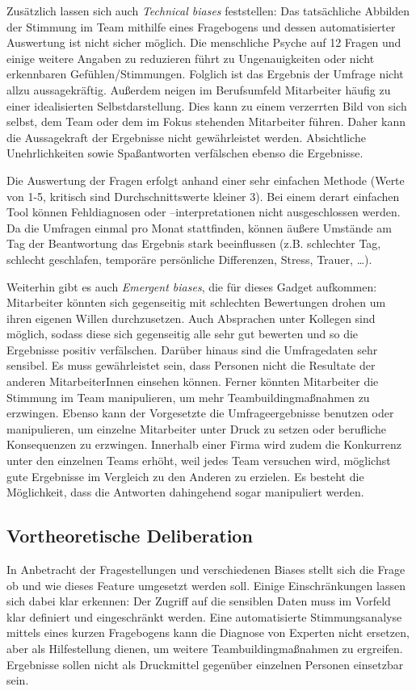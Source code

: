 \documentclass[a4paper,12pt,]{article}
\begin{document}
Zusätzlich lassen sich auch \emph{Technical biases} feststellen:  
Das tatsächliche Abbilden der Stimmung im Team mithilfe eines Fragebogens und dessen automatisierter Auswertung ist nicht sicher möglich. Die menschliche Psyche auf 12 Fragen und einige weitere Angaben zu reduzieren führt zu Ungenauigkeiten oder nicht erkennbaren Gefühlen/Stimmungen. Folglich ist das Ergebnis der Umfrage nicht allzu aussagekräftig.
Außerdem neigen im Berufsumfeld Mitarbeiter häufig zu einer idealisierten Selbstdarstellung. Dies kann zu einem verzerrten Bild von sich selbst, dem Team oder dem im Fokus stehenden Mitarbeiter führen. Daher kann die Aussagekraft der Ergebnisse nicht gewährleistet werden. Absichtliche Unehrlichkeiten sowie Spaßantworten verfälschen ebenso die Ergebnisse.

Die Auswertung der Fragen erfolgt anhand einer sehr einfachen Methode (Werte von 1-5, kritisch sind Durchschnittswerte kleiner 3). Bei einem derart einfachen Tool können Fehldiagnosen oder –interpretationen nicht ausgeschlossen werden. 
Da die Umfragen einmal pro Monat stattfinden, können äußere Umstände am Tag der Beantwortung das Ergebnis stark beeinflussen (z.B. schlechter Tag, schlecht geschlafen, temporäre persönliche Differenzen, Stress, Trauer, …).

Weiterhin gibt es auch \emph{Emergent biases}, die für dieses Gadget aufkommen: Mitarbeiter könnten sich gegenseitig mit schlechten Bewertungen drohen um ihren eigenen Willen durchzusetzen. Auch Absprachen unter Kollegen sind möglich, sodass diese sich gegenseitig alle sehr gut bewerten und so die Ergebnisse positiv verfälschen. Darüber hinaus sind die Umfragedaten sehr sensibel. Es muss gewährleistet sein, dass Personen nicht die Resultate der anderen MitarbeiterInnen einsehen können.
Ferner könnten Mitarbeiter die Stimmung im Team manipulieren, um mehr Teambuildingmaßnahmen zu erzwingen. Ebenso kann der Vorgesetzte die Umfrageergebnisse benutzen oder manipulieren, um einzelne Mitarbeiter unter Druck zu setzen oder berufliche Konsequenzen zu erzwingen.
Innerhalb einer Firma wird zudem die Konkurrenz unter den einzelnen Teams erhöht, weil jedes Team versuchen wird, möglichst gute Ergebnisse im Vergleich zu den Anderen zu erzielen. Es besteht die Möglichkeit, dass die Antworten dahingehend sogar manipuliert werden.

\subsection{Vortheoretische Deliberation}
In Anbetracht der Fragestellungen und verschiedenen Biases stellt sich die Frage ob und wie dieses Feature umgesetzt werden soll. Einige Einschränkungen lassen sich dabei klar erkennen: Der Zugriff auf die sensiblen Daten muss im Vorfeld klar definiert und eingeschränkt werden. Eine automatisierte Stimmungsanalyse mittels eines kurzen Fragebogens kann die Diagnose von Experten nicht ersetzen, aber als Hilfestellung dienen, um weitere Teambuildingmaßnahmen zu ergreifen. Ergebnisse sollen nicht als Druckmittel gegenüber einzelnen Personen einsetzbar sein.
\end{document}
